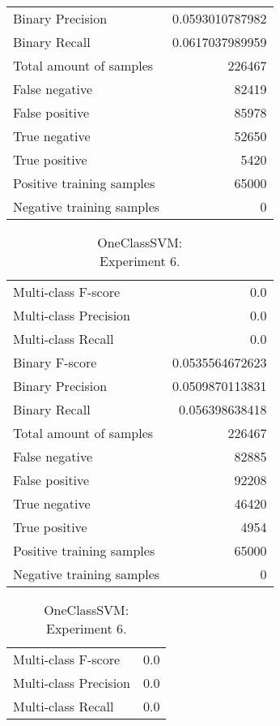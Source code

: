 \begin{table}[H]
\begin{minipage}{0.5\textwidth}
\begin{tabular}{l r}
Binary Precision & 0.0593010787982 \\
Binary Recall & 0.0617037989959 \\
\midrule
Total amount of samples & 226467 \\
False negative & 82419 \\
False positive & 85978 \\
True negative & 52650 \\
True positive & 5420 \\
\midrule
Positive training samples & 65000 \\
Negative training samples & 0 \\
\bottomrule
\end{tabular}
\end{minipage}
\end{table}
\begin{table}[H]
\begin{minipage}{0.5\textwidth}
\caption{OneClassSVM: \\Experiment 5.}
\centering
\begin{tabular}{l r}
\toprule
Multi-class F-score & 0.0 \\
Multi-class Precision & 0.0 \\
Multi-class Recall & 0.0 \\
\midrule
Binary F-score & 0.0535564672623 \\
Binary Precision & 0.0509870113831 \\
Binary Recall & 0.056398638418 \\
\midrule
Total amount of samples & 226467 \\
False negative & 82885 \\
False positive & 92208 \\
True negative & 46420 \\
True positive & 4954 \\
\midrule
Positive training samples & 65000 \\
Negative training samples & 0 \\
\bottomrule
\end{tabular}
\end{minipage}
\hfillx
\begin{minipage}{0.5\textwidth}
\caption{OneClassSVM: \\Experiment 6.}
\centering
\begin{tabular}{l r}
\toprule
Multi-class F-score & 0.0 \\
Multi-class Precision & 0.0 \\
Multi-class Recall & 0.0 \\

\end{tabular}
\end{minipage}
\end{table}
